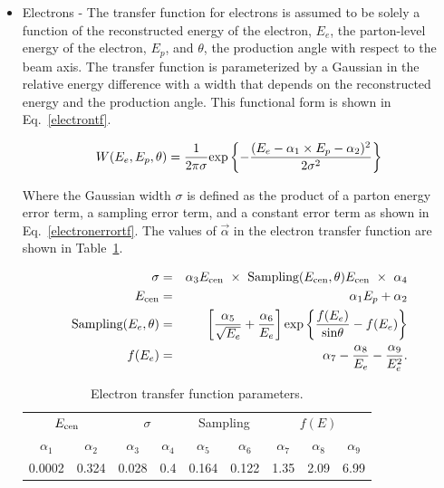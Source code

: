 \begin{itemize}
\begin{itemize}
\item Electrons - The transfer function for electrons is assumed to be
solely a function of the reconstructed energy of the electron,
$E_{e}$, the parton-level energy of the electron, $E_{p}$, and
$\theta$, the production angle with respect to the beam axis. The transfer function is parameterized by a Gaussian in the relative energy difference with a width that depends on the reconstructed energy and the production angle. This functional form is shown in Eq.~\ref{electrontf}.

\begin{equation}
\label{electrontf}
W(E_{e}, E_{p}, \theta) = \frac{1}{2\pi\sigma}\mathrm{exp}\left\{-\frac{(E_{e} - \alpha_{1}\times E_{p} - \alpha_{2})^{2}}{2\sigma^{2}}\right\}\\
\end{equation}

\noindent Where the Gaussian width $\sigma$ is defined as the product of a parton energy error term, a sampling error term, and a constant error term as shown in Eq.~\ref{electronerrortf}. The values of $\vec{\alpha}$ in the electron transfer function are shown in Table~\ref{electrontfparams}.

\begin{eqnarray}
\label{electronerrortf}
\nonumber
\sigma & = &
\alpha_{3} E_{\rm{cen}}~\times~\textrm{Sampling}(E_{\rm{cen}},\theta) E_{\rm{cen}}~\times~\alpha_{4} \\
\nonumber
E_{\rm{cen}} & = &
\alpha_{1} E_{p} + \alpha_{2} \\
\nonumber
\textrm{Sampling}(E_{e}, \theta) & = &
\left[\frac{\alpha_{5}}{\sqrt{E_{e}}} + \frac{\alpha_{6}}{E_{e}}\right]
\textrm{exp}\left\{\frac{f(E_{e})}
{\textrm{sin}\theta}-f(E_{e})\right\} \\
f(E_{e})& = & \alpha_{7} - \frac{\alpha_{8}}{E_{e}} - \frac{\alpha_{9}}{E_{e}^2}.
\end{eqnarray}

\begin{table}[!h!tbp]
\begin{center}
\caption{Electron transfer function parameters.}
\label{electrontfparams}
\begin{tabular}{cc|cc|cc|ccc}
	\multicolumn{2}{c|}{$E_{\rm{cen}}$}		& \multicolumn{2}{c|}{$\sigma$} 
&	\multicolumn{2}{c|}{Sampling} 			& \multicolumn{3}{c}{$f(E)$} \\
 	$\alpha_{1}$	&	$\alpha_{2}$		& $\alpha_{3}$	&	$\alpha_{4}$		
& 	$\alpha_{5}$	&	$\alpha_{6}$		& $\alpha_{7}$	&	$\alpha_{8}$	&	$\alpha_{9}$	\\
\hline
	0.0002	&	0.324	&	0.028	&	0.4	&	0.164	&	0.122	&	1.35	&	2.09	&	6.99	\\
\end{tabular}
\vspace{-0.1 in}
\end{center}
\end{table} 




\end{itemize}
\end{itemize}
